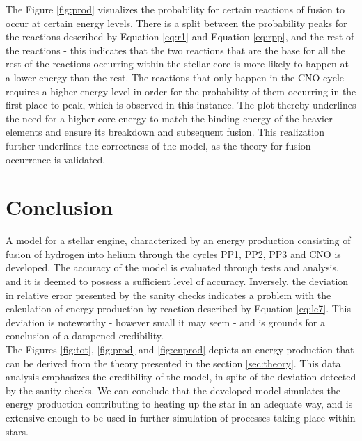 \documentclass[10pt, nofootinbib, twocolumn]{revtex4-1}
\begin{document}
The Figure \ref{fig:prod} visualizes the probability for certain reactions of fusion to occur at certain energy levels. There is a split between the probability peaks for the reactions described by Equation \eqref{eq:r1} and Equation \eqref{eq:rpp}, and the rest of the reactions - this indicates that the two reactions that are the base for all the rest of the reactions occurring within the stellar core is more likely to happen at a lower energy than the rest. The reactions that only happen in the CNO cycle requires a higher energy level in order for the probability of them occurring in the first place to peak, which is observed in this instance. 
The plot thereby underlines the need for a higher core energy to match the binding energy of the heavier elements and ensure its breakdown and subsequent fusion. This realization further underlines the correctness of the model, as the theory for fusion occurrence is validated.




\section{Conclusion}\label{sec:conclusion}
A model for a stellar engine, characterized by an energy production consisting of fusion of hydrogen into helium through the cycles PP1, PP2, PP3 and CNO is developed. The accuracy of the model is evaluated through tests and analysis, and it is deemed to possess a sufficient level of accuracy. Inversely, the deviation in relative error presented by the sanity checks indicates a problem with the calculation of energy production by reaction described by Equation \eqref{eq:le7}. This deviation is noteworthy - however small it may seem - and is grounds for a conclusion of a dampened credibility. \\

The Figures \ref{fig:tot}, \ref{fig:prod} and \ref{fig:enprod} depicts an energy production that can be derived from the theory presented in the section \ref{sec:theory}. This data analysis emphasizes the credibility of the model, in spite of the deviation detected by the sanity checks. We can conclude that the developed model simulates the energy production contributing to heating up the star in an adequate way, and is extensive enough to be used in further simulation of processes taking place within stars. \\
\end{document}
